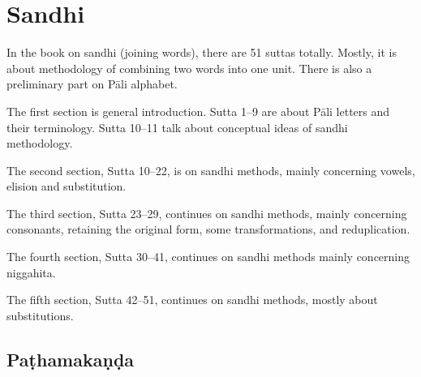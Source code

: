 \chapter{Sandhi}

In the book on sandhi (joining words), there are 51 suttas totally. Mostly, it is about methodology of combining two words into one unit. There is also a preliminary part on Pāli alphabet.

The first section is general introduction. Sutta 1--9 are about Pāli letters and their terminology. Sutta 10--11 talk about conceptual ideas of sandhi methodology.

The second section, Sutta 10--22, is on sandhi methods, mainly concerning vowels, elision and substitution.

The third section, Sutta 23--29, continues on sandhi methods, mainly concerning consonants, retaining the original form, some transformations, and reduplication.

The fourth section, Sutta 30--41, continues on sandhi methods mainly concerning niggahita.

The fifth section, Sutta 42--51, continues on sandhi methods, mostly about substitutions.

\section{Paṭhamakaṇḍa}
\raggedbottom


